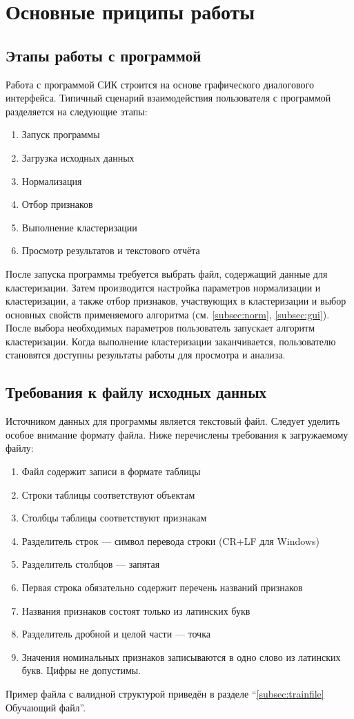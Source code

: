 \documentclass[12pt]{instruction}
\begin{document}
\section{Основные приципы работы}

\subsection{Этапы работы с программой}
Работа с программой СИК строится на основе графического диалогового интерфейса. Типичный сценарий взаимодействия пользователя с программой разделяется на следующие этапы:
\begin{enumerate}
	\item Запуск программы
	\item Загрузка исходных данных
	\item Нормализация
	\item Отбор признаков
	\item Выполнение кластеризации
	\item Просмотр результатов и текстового отчёта
\end{enumerate}

После запуска программы требуется выбрать файл, содержащий данные для кластеризации. Затем производится настройка параметров нормализации и кластеризации, а также отбор признаков, участвующих в кластеризации и выбор основных свойств применяемого алгоритма (см. \ref{subsec:norm}, \ref{subsec:gui}). После выбора необходимых параметров пользователь запускает алгоритм кластеризации. Когда выполнение кластеризации заканчивается, пользователю становятся доступны результаты работы для просмотра и анализа. 

\subsection{Требования к файлу исходных данных}
\label{subsec:req}
Источником данных для программы является текстовый файл. Следует уделить особое внимание формату файла. Ниже перечислены требования к загружаемому файлу:
\begin{enumerate}
	\item Файл содержит записи в формате таблицы
	\item Строки таблицы соответствуют объектам
	\item Столбцы таблицы соответствуют признакам
	\item Разделитель строк --- символ перевода строки (CR+LF для Windows)
	\item Разделитель столбцов --- запятая
	\item Первая строка обязательно содержит перечень названий признаков
	\item Названия признаков состоят только из латинских букв
	\item Разделитель дробной и целой части --- точка
	\item Значения номинальных признаков записываются в одно слово из латинских букв. Цифры не допустимы.
\end{enumerate}
Пример файла с  валидной структурой приведён в разделе ``\ref{subsec:trainfile} Обучающий файл''.
\end{document}
